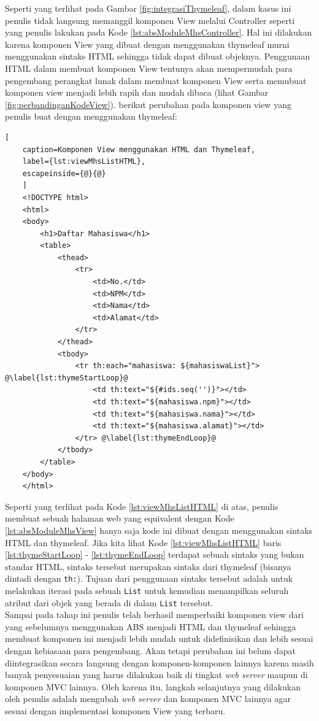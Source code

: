 Seperti yang terlihat pada Gambar \ref{fig:integrasiThymeleaf}, dalam kasus ini penulis tidak langsung memanggil komponen View melalui Controller seperti yang penulis lakukan pada Kode \ref{lst:absModuleMhsController}. Hal ini dilakukan karena komponen View yang dibuat dengan menggunakan thymeleaf murni menggunakan sintaks HTML sehingga tidak dapat dibuat objeknya. Penggunaan HTML dalam membuat komponen View tentunya akan mempermudah para pengembang perangkat lunak dalam membuat komponen View serta memubuat komponen view menjadi lebih rapih dan mudah dibaca (lihat Gambar \ref{fig:perbandinganKodeView}). berikut perubahan pada komponen view yang penulis buat dengan menggunakan thymeleaf:

\begin{minipage}{\linewidth}
    \begin{lstlisting}[
    caption=Komponen View menggunakan HTML dan Thymeleaf,
    label={lst:viewMhsListHTML},
    escapeinside={@}{@}
    ]
    <!DOCTYPE html>
    <html>
    <body>
    	<h1>Daftar Mahasiswa</h1>
    	<table>
    		<thead>
    			<tr>
    				<td>No.</td>
    				<td>NPM</td>
    				<td>Nama</td>
    				<td>Alamat</td>
    			</tr>
    		</thead>
    		<tbody>
    			<tr th:each="mahasiswa: ${mahasiswaList}"> @\label{lst:thymeStartLoop}@
    				<td th:text="${#ids.seq('')}"></td>
    				<td th:text="${mahasiswa.npm}"></td>
    				<td th:text="${mahasiswa.nama}"></td>
    				<td th:text="${mahasiswa.alamat}"></td>
    			</tr> @\label{lst:thymeEndLoop}@
    		</tbody>
    	</table>
    </body>
    </html>
    \end{lstlisting}
\end{minipage}

Seperti yang terlihat pada Kode \ref{lst:viewMhsListHTML} di atas, penulis membuat sebuah halaman web yang equivalent dengan Kode \ref{lst:absModuleMhsView} hanya saja kode ini dibuat dengan menggunakan sintaks HTML dan thymeleaf. Jika kita lihat Kode \ref{lst:viewMhsListHTML} baris \ref{lst:thymeStartLoop} - \ref{lst:thymeEndLoop} terdapat sebuah sintaks yang bukan standar HTML, sintaks tersebut merupakan sintaks dari thymeleaf (bisanya dintadi dengan \texttt{th:}). Tujuan dari penggunaan sintaks tersebut adalah untuk melakukan iterasi pada sebuah \texttt{List} untuk kemudian menampilkan seluruh atribut dari objek yang berada di dalam \texttt{List} tersebut.\\

Sampai pada tahap ini penulis telah berhasil memperbaiki komponen view dari yang sebelumnya menggunakan ABS menjadi HTML dan thymeleaf sehingga membuat komponen ini menjadi lebih mudah untuk didefinisikan dan lebih sesuai dengan kebiasaan para pengembang. Akan tetapi perubahan ini belum dapat diintegrasikan secara langsung dengan komponen-komponen lainnya karena masih banyak penyesuaian yang harus dilakukan baik di tingkat \textit{web server} maupun di komponen MVC lainnya. Oleh karena itu, langkah selanjutnya yang dilakukan oleh penulis adalah mengubah \textit{web server} dan komponen MVC lainnya agar sesuai dengan implementasi komponen View yang terbaru.

